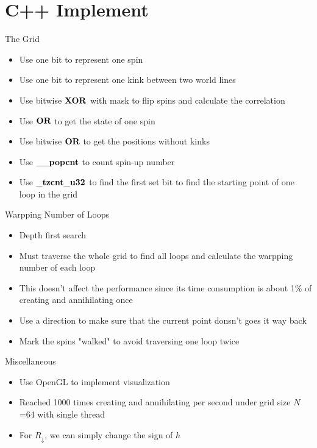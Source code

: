 \documentclass[aspectratio=43]{beamer}
\begin{document}
\section{C++ Implement}
\begin{frame}{The Grid}
  \begin{itemize}
    \item Use one bit to represent one spin
    \item Use one bit to represent one kink between two world lines
    \item Use bitwise $\bf{XOR}$ with mask to flip spins and calculate the correlation
    \item Use $\bf{OR}$ to get the state of one spin
    \item Use bitwise $\bf{OR}$ to get the positions without kinks
    \item Use $\bf{\_\_popcnt}$ to count spin-up number
    \item Use $\bf{\_tzcnt\_u32}$ to find the first set bit to find the starting point of one loop in the grid
  \end{itemize}
\end{frame}

\begin{frame}{Warpping Number of Loops}
  \begin{itemize}
    \item Depth first search
    \item Must traverse the whole grid to find all loops and calculate the warpping number of each loop
    \item This doesn't affect the performance since its time consumption is about 1\% of creating and annihilating once
    \item Use a direction to make sure that the current point donsn't goes it way back
    \item Mark the spins "walked" to avoid traversing one loop twice
  \end{itemize}
\end{frame}

\begin{frame}{Miscellaneous}
  \begin{itemize}
    \item Use OpenGL to implement visualization
    \item Reached 1000 times creating and annihilating per second under grid size $N$=64 with single thread
    \item For $R_\downarrow$, we can simply change the sign of $h$
  \end{itemize}
\end{frame}
\end{document}
